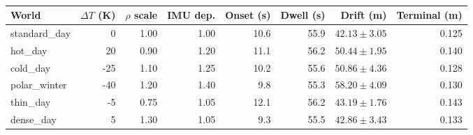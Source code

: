 \begin{table}[t]
\centering
\caption{}
\label{tab:weather}
\footnotesize
\begin{tabular}{@{}lrrrrrrr@{}}
\toprule
World & $\Delta T$ (K) & $\rho$ scale & IMU dep. & Onset (s) & Dwell (s) & Drift (m) & Terminal (m) \\
\midrule
standard\_day & 0   & 1.00 & 1.00 & 10.6 & 55.9 & $42.13 \pm 3.05$ & 0.125 \\
hot\_day      & 20  & 0.90 & 1.20 & 11.1 & 56.2 & $50.44 \pm 1.95$ & 0.140 \\
cold\_day     & -25 & 1.10 & 1.25 & 10.2 & 55.6 & $50.86 \pm 4.36$ & 0.128 \\
polar\_winter & -40 & 1.20 & 1.40 & 9.8 & 55.3 & $58.20 \pm 4.09$ & 0.130 \\
thin\_day     & -5  & 0.75 & 1.05 & 12.1 & 56.2 & $43.19 \pm 1.76$ & 0.143 \\
dense\_day    & 5   & 1.30 & 1.05 & 9.3 & 55.5 & $42.86 \pm 3.43$ & 0.133 \\
\bottomrule
\end{tabular}
\end{table}
